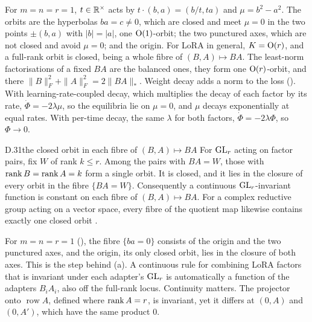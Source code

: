 For $m=n=r=1$, $t\in\mathbb{R}^\times$ acts by $t\cdot(b,a)=(b/t,ta)$ and $\mu=b^2-a^2$. The orbits are the hyperbolas
$ba=c\ne0$, which are closed and meet $\mu=0$ in the two points $\pm(b,a)$ with $\lvert b\rvert=\lvert a\rvert$, one
$\mathrm{O}(1)$-orbit; the two punctured axes, which are not closed and avoid $\mu=0$; and the origin. For LoRA in general,
$K=\mathrm{O}(r)$, and a full-rank orbit is closed, being a whole fibre of $(B,A)\mapsto BA$. The least-norm factorisations of
a fixed $BA$ are the balanced ones, they form one $\mathrm{O}(r)$-orbit, and there $\|B\|_F^2+\|A\|_F^2=2\|BA\|_*$. Weight
decay adds a norm to the loss (). With learning-rate-coupled decay, which multiplies the decay
of each factor by its rate, $\dot\Phi=-2\lambda\mu$, so the equilibria lie on $\mu=0$, and $\mu$ decays exponentially at
equal rates. With per-time decay, the same $\lambda$ for both factors, $\dot\Phi=-2\lambda\Phi$, so $\Phi\to0$.


\begin{bgfact}{D.31}{the closed orbit in each fibre of $(B,A)\mapsto BA$}
For $\mathrm{GL}_r$ acting on factor pairs, fix $W$ of rank $k\le r$. Among the pairs with $BA=W$, those with $\operatorname{rank} B=\operatorname{rank} A=k$
form a single orbit. It is closed, and it lies in the closure of every orbit in the fibre $\{BA=W\}$. Consequently a
continuous $\mathrm{GL}_r$-invariant function is constant on each fibre of $(B,A)\mapsto BA$. For a complex reductive group
acting on a vector space, every fibre of the quotient map likewise contains exactly one closed orbit
\citep[Ch.~1]{xmumford1994geometric}.
\end{bgfact}

For $m=n=r=1$ (), the fibre $\{ba=0\}$ consists of the origin and the two punctured axes, and the origin,
its only closed orbit, lies in the closure of both axes. This is the step behind (a). A
continuous rule for combining LoRA factors that is invariant under each adapter's $\mathrm{GL}_r$ is automatically a function of
the adapters $B_iA_i$, also off the full-rank locus. Continuity matters. The projector onto $\operatorname{row}A$,
defined where $\operatorname{rank} A=r$, is invariant, yet it differs at $(0,A)$ and $(0,A')$, which have the same product $0$.


